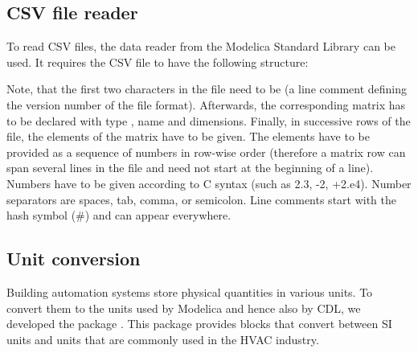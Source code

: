 \documentclass[letterpaper,10pt, openany,english]{sphinxmanual}
\begin{document}
\subsection{CSV file reader}
\label{\detokenize{verification:csv-file-reader}}
To read CSV files, the data reader 
from the Modelica Standard Library
can be used. It requires the CSV file to have the following structure:

\begin{sphinxVerbatim}[commandchars=\\\{\}]
 
     
     
     
     
     
    
\end{sphinxVerbatim}

Note, that the first two characters in the file need to be 
(a line comment defining the version number of the file format).
Afterwards, the corresponding matrix has to be declared with type
, name and dimensions.
Finally, in successive rows of the file, the elements
of the matrix have to be given.
The elements have to be provided as a sequence of numbers
in row-wise order (therefore a matrix row can span several
lines in the file and need not start at the beginning of a line).
Numbers have to be given according to C syntax
(such as 2.3, -2, +2.e4). Number separators are spaces,
tab, comma, or semicolon.
Line comments start with the hash symbol (\#) and can appear everywhere.


\subsection{Unit conversion}
\label{\detokenize{verification:unit-conversion}}
Building automation systems store physical quantities in various units.
To convert them to the units used by Modelica and hence also by CDL,
we developed the package .
This package provides blocks that convert between SI units
and units that are commonly used in the HVAC industry.
\end{document}
